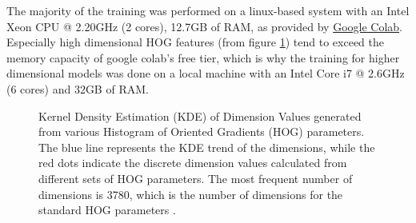     The majority of the training was performed on a linux-based system with an Intel Xeon CPU @ 2.20GHz (2 cores), 12.7GB of RAM, as provided by \href{https://colab.research.google.com/}{Google Colab}. Especially high dimensional HOG features (from figure \ref{fig:dimension_distribution}) tend to exceed the memory capacity of google colab's free tier, which is why the training for higher dimensional models was done on a local machine with an Intel Core i7 @ 2.6GHz (6 cores) and 32GB of RAM.

    \begin{figure}
        
        \caption{Kernel Density Estimation (KDE) of Dimension Values generated from various Histogram of Oriented Gradients (HOG) parameters. The blue line represents the KDE trend of the dimensions, while the red dots indicate the discrete dimension values calculated from different sets of HOG parameters. The most frequent number of dimensions is 3780, which is the number of dimensions for the standard HOG parameters \cite{dalal_2005_histograms}.}
        \label{fig:dimension_distribution}
    \end{figure}